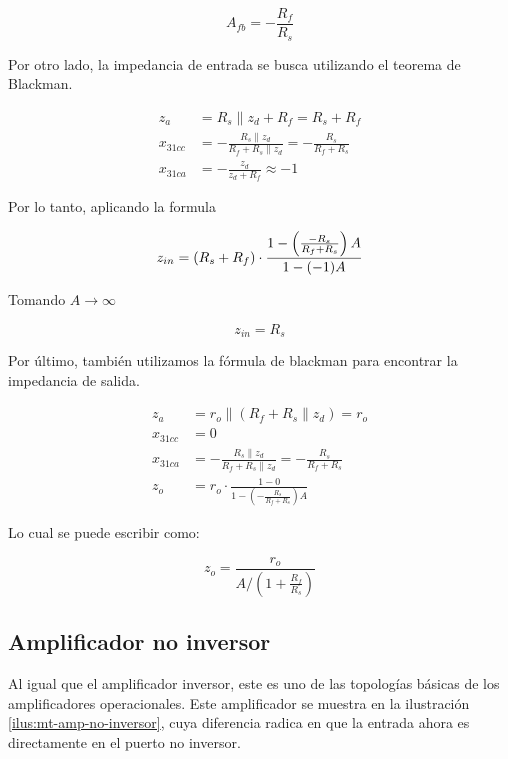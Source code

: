 \begin{equation}
    \boxed{A_{fb} = -\frac{R_f}{R_s}}
    \label{eq:mt-ganancia-amp-inversor}
\end{equation}


Por otro lado, la impedancia de entrada se busca utilizando el teorema de Blackman.

\begin{align*}
z_a &= R_s \parallel z_d + R_f = R_s + R_f \\
x_{31cc} &= -\frac{R_s \parallel z_d}{R_f + R_s \parallel z_d} = -\frac{R_s}{R_f + R_s} \\
x_{31ca} &= -\frac{z_d}{z_d + R_f} \approx -1
\end{align*}


Por lo tanto, aplicando la formula 

\begin{equation*}
z_{in} = (R_s + R_f) \cdot \frac{1 - \left( \frac{-R_s}{R_f + R_s} \right) A}{1 - (-1)A} \\
\end{equation*}

Tomando $A \rightarrow \infty$ 

\begin{equation}
    \boxed{z_{in} = R_s}
\end{equation}

Por último, también utilizamos la fórmula de blackman para encontrar la impedancia de salida.

\begin{align*}
z_a &= r_o \parallel (R_f + R_s \parallel z_d) = r_o \\
x_{31cc} &= 0 \\
x_{31ca} &= -\frac{R_s \parallel z_d}{R_f + R_s \parallel z_d} = -\frac{R_s}{R_f + R_s} \\
z_o &= r_o \cdot \frac{1 - 0}{1 - \left( -\frac{R_s}{R_f + R_s} \right) A} 
\end{align*}

Lo cual se puede escribir como:

\begin{equation}
\boxed{z_o = \frac{r_o}{A / \left( 1 + \frac{R_f}{R_s} \right)}}
\end{equation}

\subsection{Amplificador no inversor}

Al igual que el amplificador inversor, este es uno de las topologías básicas de los amplificadores operacionales. Este amplificador se muestra en la ilustración \ref{ilus:mt-amp-no-inversor}, cuya diferencia radica en que la entrada ahora es directamente en el puerto no inversor.

